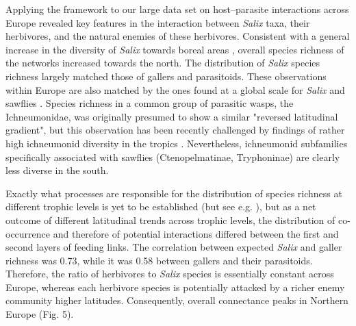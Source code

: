 \documentclass[12pt]{article}
\begin{document}
Applying the framework to our large data set on host–parasite interactions
across Europe revealed key features in the interaction between \textit{Salix}
taxa, their herbivores, and the natural enemies of these herbivores.
Consistent with a general increase in the diversity of \textit{Salix} towards
boreal areas \citep{Cronk2015}, overall species richness of the networks
increased towards the north. The distribution of \textit{Salix} species
richness largely matched those of gallers and parasitoids. These observations
within Europe are also matched by the ones found at a global scale for
\textit{Salix} \citep{Argus1997, Cronk2015, Wu2015} and sawflies
\citep{Kouki1994, Kouki1999}. Species richness in a common group of parasitic
wasps, the Ichneumonidae, was originally presumed to show a similar "reversed
latitudinal gradient", but this observation has been recently challenged by
findings of rather high ichneumonid diversity in the tropics
\citep{Veijalainen2013}. Nevertheless, ichneumonid subfamilies specifically
associated with sawflies (Ctenopelmatinae, Tryphoninae) are clearly less
diverse in the south.

Exactly what processes are responsible for the distribution of species
richness at different trophic levels is yet to be established (but see e.g.
\citealt{Roininen2005, Nyman2010, Leppanen2014}), but as a net outcome of
different latitudinal trends across trophic levels, the distribution of co-occurrence and therefore of potential interactions differed between the first
and second layers of feeding links. The correlation between expected
\textit{Salix} and galler richness was 0.73, while it was 0.58 between
gallers and their parasitoids. Therefore, the ratio of herbivores to
\textit{Salix} species is essentially constant across Europe, whereas each
herbivore species is potentially attacked by a richer enemy community higher
latitudes. Consequently, overall connectance peaks in Northern Europe (Fig.
5).
\end{document}
